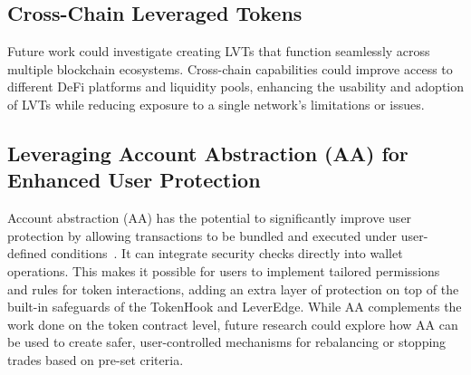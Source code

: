 \subsection{Cross-Chain Leveraged Tokens}
Future work could investigate creating LVTs that function seamlessly across multiple blockchain ecosystems. Cross-chain capabilities could improve access to different DeFi platforms and liquidity pools, enhancing the usability and adoption of LVTs while reducing exposure to a single network's limitations or issues.

\subsection{Leveraging Account Abstraction (AA) for Enhanced User Protection}
Account abstraction (AA) has the potential to significantly improve user protection by allowing transactions to be bundled and executed under user-defined conditions~\cite{Ethereum_AA}. It can integrate security checks directly into wallet operations. This makes it possible for users to implement tailored permissions and rules for token interactions, adding an extra layer of protection on top of the built-in safeguards of the TokenHook and LeverEdge. While AA complements the work done on the token contract level, future research could explore how AA can be used to create safer, user-controlled mechanisms for rebalancing or stopping trades based on pre-set criteria.